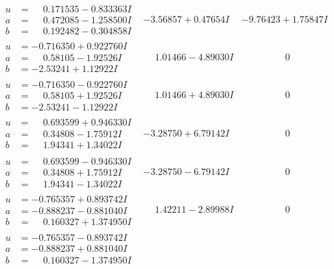 \documentclass[1p]{elsarticle_modified}
\theoremstyle{definition}
\begin{document}
$$\begin{array}{c|c|c}
\begin{aligned}
u &= \phantom{-}0.171535 - 0.833363 I \\
a &= \phantom{-}0.472085 - 1.258500 I \\
b &= \phantom{-}0.192482 - 0.304858 I\end{aligned}
 & -3.56857 + 0.47654 I & -9.76423 + 1.75847 I \\ \hline\begin{aligned}
u &= -0.716350 + 0.922760 I \\
a &= \phantom{-}0.58105 - 1.92526 I \\
b &= -2.53241 + 1.12922 I\end{aligned}
 & \phantom{-}1.01466 - 4.89030 I & \phantom{-0.000000 } 0 \\ \hline\begin{aligned}
u &= -0.716350 - 0.922760 I \\
a &= \phantom{-}0.58105 + 1.92526 I \\
b &= -2.53241 - 1.12922 I\end{aligned}
 & \phantom{-}1.01466 + 4.89030 I & \phantom{-0.000000 } 0 \\ \hline\begin{aligned}
u &= \phantom{-}0.693599 + 0.946330 I \\
a &= \phantom{-}0.34808 - 1.75912 I \\
b &= \phantom{-}1.94341 + 1.34022 I\end{aligned}
 & -3.28750 + 6.79142 I & \phantom{-0.000000 } 0 \\ \hline\begin{aligned}
u &= \phantom{-}0.693599 - 0.946330 I \\
a &= \phantom{-}0.34808 + 1.75912 I \\
b &= \phantom{-}1.94341 - 1.34022 I\end{aligned}
 & -3.28750 - 6.79142 I & \phantom{-0.000000 } 0 \\ \hline\begin{aligned}
u &= -0.765357 + 0.893742 I \\
a &= -0.888237 - 0.881040 I \\
b &= \phantom{-}0.160327 + 1.374950 I\end{aligned}
 & \phantom{-}1.42211 - 2.89988 I & \phantom{-0.000000 } 0 \\ \hline\begin{aligned}
u &= -0.765357 - 0.893742 I \\
a &= -0.888237 + 0.881040 I \\
b &= \phantom{-}0.160327 - 1.374950 I\end{aligned}

\end{array}$$
\end{document}

